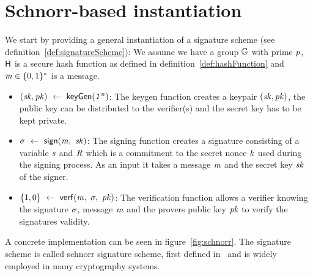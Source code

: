\section{Schnorr-based instantiation}\label{sec:schnorrInst}

We start by providing a general instantiation of a signature scheme (see definition~\ref{def:signatureScheme}):
We assume we have a group $\mathbb{G}$ with prime $\mathit{p}$, $\mathsf{H}$ is a secure hash function as defined in definition~\ref{def:hashFunction} and $\mathit{m} \in \{0,1\}^{*}$ is a message.

\begin{itemize}
    \item $(\mathit{sk}, \mathit{pk}) ~\leftarrow~ \mathsf{keyGen}(\mathit{1^n})$: The keygen function creates a keypair $(\mathit{sk}, \mathit{pk})$, the public key can be distributed to the verifier(s) and the secret key has to be kept private. \\
    \item $\sigma ~\leftarrow~ \mathsf{sign}(\mathit{m} ,~ \mathit{sk})$: The signing function creates a signature consisting of a variable $\mathit{s}$ and $\mathit{R}$ which is a commitment to the secret nonce $\mathit{k}$ used during the signing process.
    As an input it takes a message $\mathit{m}$ and the secret key $\mathit{sk}$ of the signer.
    \item $\{1,0\} ~\leftarrow~ \mathsf{verf}(\mathit{m} ,~ \sigma ,~ \mathit{pk})$: The verification function allows a verifier knowing the signature $\sigma$, message $\mathit{m}$ and the provers public key $\mathit{pk}$ to verify the signatures
    validity. \\
\end{itemize}
A concrete implementation can be seen in figure~\ref{fig:schnorr}. The signature scheme is called schnorr signature scheme, first defined in~\cite{schnorr1989efficient} and is widely employed in many cryptography systems.
